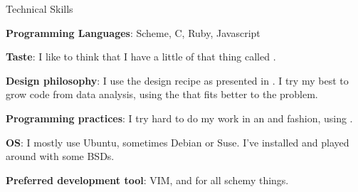 \begin{rubric}{Technical Skills}{ 

    \entry* \textbf{Programming Languages}: Scheme, C, Ruby, Javascript

    \entry* \textbf{Taste}: I like to think that I have a little of that thing
    called .

    \entry* \textbf{Design philosophy}: I use the design recipe as presented in
    . I try my best to grow code
    from data analysis, using the
    that fits better to the problem.

    \entry* \textbf{Programming practices}: I try hard to do my work in an
    and
    fashion, using . 

    \entry* \textbf{OS}: I mostly use Ubuntu, sometimes Debian or Suse. I've
    installed and played around with some BSDs.

    \entry* \textbf{Preferred development tool}: VIM, and
    for all schemy things. 

}\end{rubric}
